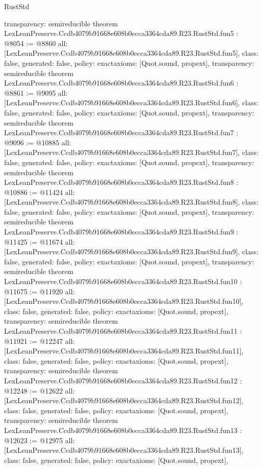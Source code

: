 \begin{lexlean}{RustStd}
\begin{coremodule}
{  transparency: semireducible
}
theorem LexLeanPreserve.Ccdb4079b91668e608b0ecca3364cda89.R23.RustStd.fun5 : @8054 := @8860 {
  all: [LexLeanPreserve.Ccdb4079b91668e608b0ecca3364cda89.R23.RustStd.fun5],
  class: false,
  generated: false,
  policy: exact{axioms: [Quot.sound, propext]},
  transparency: semireducible
}
theorem LexLeanPreserve.Ccdb4079b91668e608b0ecca3364cda89.R23.RustStd.fun6 : @8861 := @9095 {
  all: [LexLeanPreserve.Ccdb4079b91668e608b0ecca3364cda89.R23.RustStd.fun6],
  class: false,
  generated: false,
  policy: exact{axioms: [Quot.sound, propext]},
  transparency: semireducible
}
theorem LexLeanPreserve.Ccdb4079b91668e608b0ecca3364cda89.R23.RustStd.fun7 : @9096 := @10885 {
  all: [LexLeanPreserve.Ccdb4079b91668e608b0ecca3364cda89.R23.RustStd.fun7],
  class: false,
  generated: false,
  policy: exact{axioms: [Quot.sound, propext]},
  transparency: semireducible
}
theorem LexLeanPreserve.Ccdb4079b91668e608b0ecca3364cda89.R23.RustStd.fun8 : @10886 := @11424 {
  all: [LexLeanPreserve.Ccdb4079b91668e608b0ecca3364cda89.R23.RustStd.fun8],
  class: false,
  generated: false,
  policy: exact{axioms: [Quot.sound, propext]},
  transparency: semireducible
}
theorem LexLeanPreserve.Ccdb4079b91668e608b0ecca3364cda89.R23.RustStd.fun9 : @11425 := @11674 {
  all: [LexLeanPreserve.Ccdb4079b91668e608b0ecca3364cda89.R23.RustStd.fun9],
  class: false,
  generated: false,
  policy: exact{axioms: [Quot.sound, propext]},
  transparency: semireducible
}
theorem LexLeanPreserve.Ccdb4079b91668e608b0ecca3364cda89.R23.RustStd.fun10 : @11675 := @11920 {
  all: [LexLeanPreserve.Ccdb4079b91668e608b0ecca3364cda89.R23.RustStd.fun10],
  class: false,
  generated: false,
  policy: exact{axioms: [Quot.sound, propext]},
  transparency: semireducible
}
theorem LexLeanPreserve.Ccdb4079b91668e608b0ecca3364cda89.R23.RustStd.fun11 : @11921 := @12247 {
  all: [LexLeanPreserve.Ccdb4079b91668e608b0ecca3364cda89.R23.RustStd.fun11],
  class: false,
  generated: false,
  policy: exact{axioms: [Quot.sound, propext]},
  transparency: semireducible
}
theorem LexLeanPreserve.Ccdb4079b91668e608b0ecca3364cda89.R23.RustStd.fun12 : @12248 := @12622 {
  all: [LexLeanPreserve.Ccdb4079b91668e608b0ecca3364cda89.R23.RustStd.fun12],
  class: false,
  generated: false,
  policy: exact{axioms: [Quot.sound, propext]},
  transparency: semireducible
}
theorem LexLeanPreserve.Ccdb4079b91668e608b0ecca3364cda89.R23.RustStd.fun13 : @12623 := @12975 {
  all: [LexLeanPreserve.Ccdb4079b91668e608b0ecca3364cda89.R23.RustStd.fun13],
  class: false,
  generated: false,
  policy: exact{axioms: [Quot.sound, propext]},
}
\end{coremodule}
\end{lexlean}
